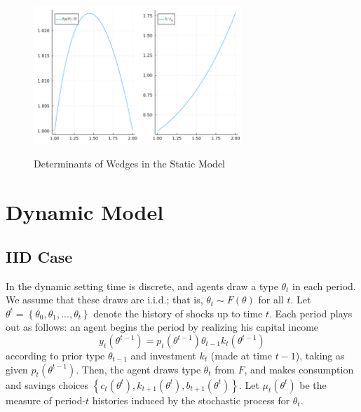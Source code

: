 \documentclass[11pt]{article}
\begin{document}
\begin{figure}[htbp]
    \centering
    \caption{Determinants of Wedges in the Static Model}
    \includegraphics[width = 0.7\textwidth]{figures/determs.png}
    \label{fig:determs}
\end{figure}

\section{Dynamic Model} \label{sec:dyn_mod}

\subsection{IID Case}

In the dynamic setting time is discrete, and agents draw a type $\theta_{t}$
in each period. We assume that these draws are i.i.d.; that is, $\theta_{t}\sim F(\theta)$
for all $t$. Let $\theta^{t}=\left\{ \theta_{0},\theta_{1},...,\theta_{t}\right\} $
denote the history of shocks up to time $t$. Each period plays out
as follows: an agent begins the period by realizing his capital income
\begin{equation}
    y_{t}\left(\theta^{t-1}\right)=p_{t}\left(\theta^{t-1}\right)\theta_{t-1}k_{t}\left(\theta^{t-1}\right) \label{eq:dyn_yt}
\end{equation}
according to prior type $\theta_{t-1}$ and investment $k_{t}$ (made
at time $t-1$), taking as given $p_{t}\left(\theta^{t-1}\right)$.
Then, the agent draws type $\theta_{t}$ from $F$, and makes consumption
and savings choices $\left\{ c_{t}\left(\theta^{t}\right),k_{t+1}\left(\theta^{t}\right),b_{t+1}\left(\theta^{t}\right)\right\} $.
Let $\mu_{t}\left(\theta^{t}\right)$ be the measure of period-$t$
histories induced by the stochastic process for $\theta_{t}$. 
\end{document}
